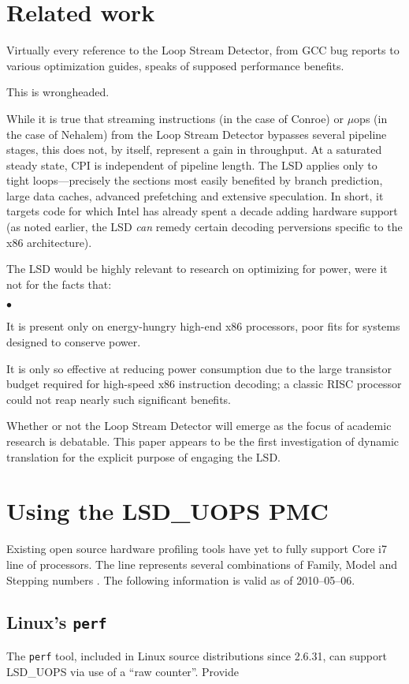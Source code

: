 \documentclass[]{sigplanconf}
\newcommand{\squishlist}{\begin{list}{$\bullet$}
  {\setlength{\itemsep}{0pt}
    \setlength{\parsep}{3pt}
    \setlength{\topsep}{3pt}
    \setlength{\partopsep}{0pt}
    \setlength{\leftmargin}{1.5em}
    \setlength{\labelwidth}{1em}
    \setlength{\labelsep}{0.5em}}}
\newcommand{\squishend}{\end{list}}
\begin{document}
\section{Related work}
Virtually every reference to the Loop Stream Detector, from GCC bug reports
\cite{gcclsd} to various optimization guides, speaks of supposed performance benefits.

This is wrongheaded.

While it is true that streaming instructions (in the case of Conroe) or $\mu$ops
(in the case of Nehalem) from the Loop Stream Detector bypasses several pipeline stages,
this does not, by itself, represent a gain in throughput. At a saturated steady
state, CPI is independent of pipeline length. The LSD applies only to tight
loops---precisely the sections most easily benefited by branch prediction,
large data caches, advanced prefetching and extensive speculation. In short,
it targets code for which Intel has already spent a decade adding hardware
support (as noted earlier, the LSD \textit{can} remedy certain decoding
perversions specific to the x86 architecture).

The LSD would be highly relevant to research on optimizing for power, were it
not for the facts that:
\squishlist
\item It is present only on energy-hungry high-end x86 processors, poor fits for
systems designed to conserve power.
\item It is only so effective at reducing power consumption due to the large
transistor budget required for high-speed x86 instruction decoding; a classic
RISC processor could not reap nearly such significant benefits.
\squishend
Whether or not the Loop Stream Detector will emerge as the focus of academic
research is debatable. This paper appears to be the first investigation
of dynamic translation for the explicit purpose of engaging the LSD.
\appendix
\section{Using the LSD\_UOPS PMC}

Existing open source hardware profiling tools have yet to fully support Core\texttrademark
i7 line of processors. The line represents several combinations of Family,
Model and Stepping numbers \cite{intelcpuid}. The following information is valid
as of 2010--05--06.
\subsection{Linux's \texttt{perf}}
The \texttt{perf} tool, included in Linux source distributions since 2.6.31,
can support LSD\_UOPS via use of a ``raw counter''. Provide
\end{document}
